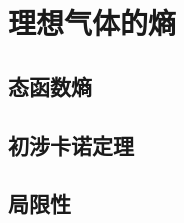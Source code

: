 

\section{理想气体的熵}\label{11-2}

\subsection{态函数熵}\label{11-2-1}

\subsection{初涉卡诺定理}\label{11-2-2}

\subsection{局限性}\label{11-2-3}